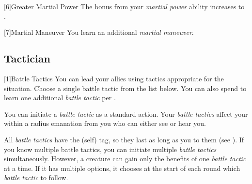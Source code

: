         [6]{Greater Martial Power} The bonus from your \textit{martial power} ability increases to .

        [7]{Martial Maneuver}
        You learn an additional \textit{martial maneuver}.

    \subsection{Tactician}

        [1]{Battle Tactics}
        You can lead your allies using tactics appropriate for the situation.
        Choose a single battle tactic from the list below.
        You can also spend  to learn one additional \textit{battle tactic} per .

        You can initiate a \textit{battle tactic} as a standard action.
        Your \textit{battle tactics} affect your  within a \arealarge radius emanation from you who can either see or hear you.

        All \textit{battle tactics} have the  (self) tag, so they last as long as you  to them (see ).
        If you know multiple battle tactics, you can initiate multiple \textit{battle tactics} simultaneously.
        However, a creature can gain only the benefits of one \textit{battle tactic} at a time.
        If it has multiple options, it chooses at the start of each round which \textit{battle tactic} to follow.

